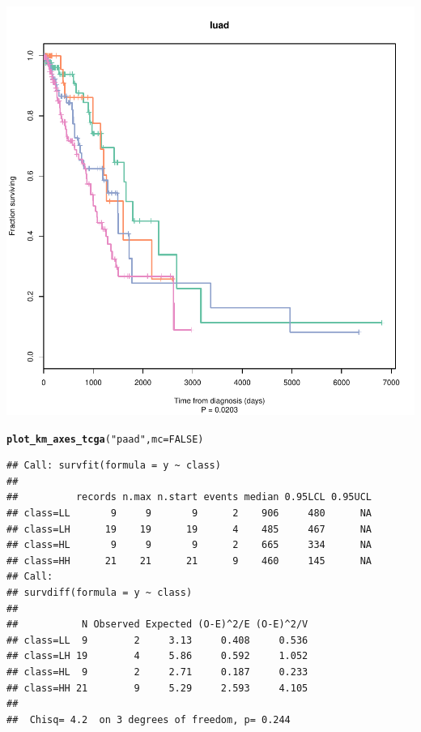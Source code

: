 \documentclass{article}\usepackage[]{graphicx}\usepackage[]{color}
\makeatletter
\def\maxwidth{ %
  \ifdim\Gin@nat@width>\linewidth
    \linewidth
  \else
    \Gin@nat@width
  \fi
}
\newcommand{\hlnum}[1]{\textcolor[rgb]{0.686,0.059,0.569}{#1}}%
\newcommand{\hlstr}[1]{\textcolor[rgb]{0.192,0.494,0.8}{#1}}%
\newcommand{\hlstd}[1]{\textcolor[rgb]{0.345,0.345,0.345}{#1}}%
\newcommand{\hlkwc}[1]{\textcolor[rgb]{0.333,0.667,0.333}{#1}}%
\newcommand{\hlkwd}[1]{\textcolor[rgb]{0.737,0.353,0.396}{\textbf{#1}}}%
\newenvironment{kframe}{%
 \def\at@end@of@kframe{}%
 \ifinner\ifhmode%
  \def\at@end@of@kframe{\end{minipage}}%
  \begin{minipage}{\columnwidth}%
 \fi\fi%
 \def\FrameCommand##1{\hskip\@totalleftmargin \hskip-\fboxsep
 \colorbox{shadecolor}{##1}\hskip-\fboxsep
     \hskip-\linewidth \hskip-\@totalleftmargin \hskip\columnwidth}%
 \MakeFramed {\advance\hsize-\width
   \@totalleftmargin\z@ \linewidth\hsize
   \@setminipage}}%
 {\par\unskip\endMakeFramed%
 \at@end@of@kframe}
\newenvironment{knitrout}{}{} %
\makeatother
\begin{document}
\begin{knitrout}
{}




{\centering \includegraphics[width=\maxwidth]{figure/km-curves-14} 

}


\begin{kframe}\begin{alltt}
\hlkwd{plot_km_axes_tcga}\hlstd{(}\hlstr{"paad"}\hlstd{,} \hlkwc{mc} \hlstd{=} \hlnum{FALSE}\hlstd{)}
\end{alltt}
\begin{verbatim}
## Call: survfit(formula = y ~ class)
## 
##          records n.max n.start events median 0.95LCL 0.95UCL
## class=LL       9     9       9      2    906     480      NA
## class=LH      19    19      19      4    485     467      NA
## class=HL       9     9       9      2    665     334      NA
## class=HH      21    21      21      9    460     145      NA
## Call:
## survdiff(formula = y ~ class)
## 
##           N Observed Expected (O-E)^2/E (O-E)^2/V
## class=LL  9        2     3.13     0.408     0.536
## class=LH 19        4     5.86     0.592     1.052
## class=HL  9        2     2.71     0.187     0.233
## class=HH 21        9     5.29     2.593     4.105
## 
##  Chisq= 4.2  on 3 degrees of freedom, p= 0.244
\end{verbatim}
\end{kframe}


\end{knitrout}
\end{document}
